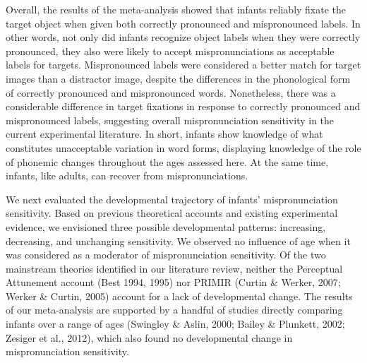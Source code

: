 \documentclass[man]{apa6}
\theoremstyle{definition}
\theoremstyle{definition}
\theoremstyle{definition}
\theoremstyle{remark}
\begin{document}
Overall, the results of the meta-analysis showed that infants reliably
fixate the target object when given both correctly pronounced and
mispronounced labels. In other words, not only did infants recognize
object labels when they were correctly pronounced, they also were likely
to accept mispronunciations as acceptable labels for targets.
Mispronounced labels were considered a better match for target images
than a distractor image, despite the differences in the phonological
form of correctly pronounced and mispronounced words. Nonetheless, there
was a considerable difference in target fixations in response to
correctly pronounced and mispronounced labels, suggesting overall
mispronunciation sensitivity in the current experimental literature. In
short, infants show knowledge of what constitutes unacceptable variation
in word forms, displaying knowledge of the role of phonemic changes
throughout the ages assessed here. At the same time, infants, like
adults, can recover from mispronunciations.

We next evaluated the developmental trajectory of infants'
mispronunciation sensitivity. Based on previous theoretical accounts and
existing experimental evidence, we envisioned three possible
developmental patterns: increasing, decreasing, and unchanging
sensitivity. We observed no influence of age when it was considered as a
moderator of mispronunciation sensitivity. Of the two mainstream
theories identified in our literature review, neither the Perceptual
Attunement account (Best 1994, 1995) nor PRIMIR (Curtin \& Werker, 2007;
Werker \& Curtin, 2005) account for a lack of developmental change. The
results of our meta-analysis are supported by a handful of studies
directly comparing infants over a range of ages (Swingley \& Aslin,
2000; Bailey \& Plunkett, 2002; Zesiger et al., 2012), which also found
no developmental change in mispronunciation sensitivity.
\end{document}
